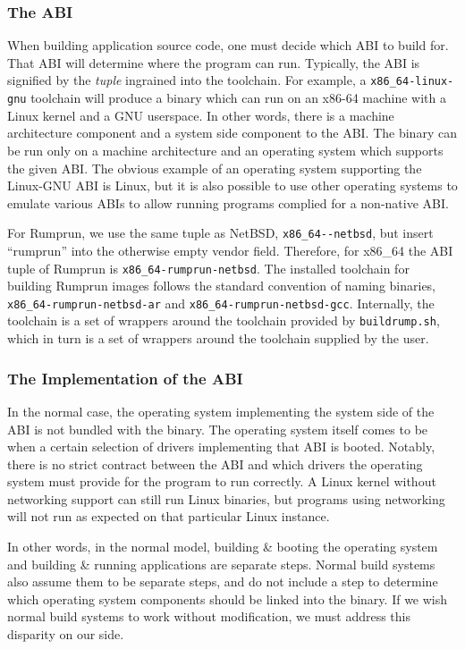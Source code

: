 \subsubsection*{The ABI}

When building application source code, one must decide which ABI to
build for.  That ABI will determine where the program can run.  Typically,
the ABI is signified by the \textit{tuple} ingrained into the toolchain.
For example, a \verb+x86_64-linux-gnu+ toolchain will produce a
binary which can run on an x86-64 machine with a Linux kernel and a GNU
userspace.  In other words, there is a machine architecture component
and a system side component to the ABI.  The binary can be run only on a
machine architecture and an operating system which supports the given ABI.
The obvious example of an operating system supporting the Linux-GNU ABI
is Linux, but it is also possible to use other operating systems to emulate
various ABIs to allow running programs complied for a non-native ABI.

For Rumprun, we use the same tuple as NetBSD, \eg \verb+x86_64--netbsd+,
but insert ``rumprun'' into the otherwise empty vendor field.  Therefore,
for x86\_64 the ABI tuple of Rumprun is \verb+x86_64-rumprun-netbsd+.
The installed toolchain for building Rumprun images follows the standard
convention of naming binaries, \eg \verb+x86_64-rumprun-netbsd-ar+
and \verb+x86_64-rumprun-netbsd-gcc+.  Internally, the toolchain is a
set of wrappers around the toolchain provided by \texttt{buildrump.sh}, which in
turn is a set of wrappers around the toolchain supplied by the user.


\subsubsection*{The Implementation of the ABI}

In the normal case, the operating system implementing the system side
of the ABI is not bundled with the binary.  The operating system itself
comes to be when a certain selection of drivers implementing that ABI
is booted.  Notably, there is no strict contract between the ABI and
which drivers the operating system must provide for the program to
run correctly.  A Linux kernel without networking support can still run
Linux binaries, but programs using networking will not run as expected
on that particular Linux instance.

In other words, in the normal model, building \& booting the operating
system and building \& running applications are separate steps.  Normal build
systems also assume them to be separate steps, and do not include a step
to determine which operating system components should be linked into the
binary.  If we wish normal build systems to work without modification,
we must address this disparity on our side.



